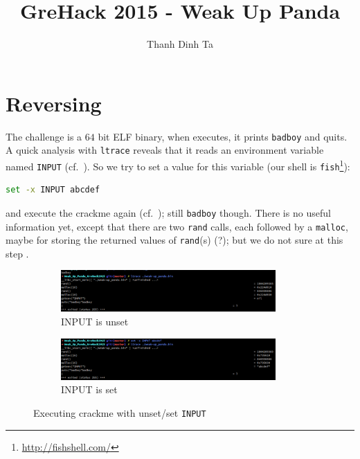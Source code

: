 \documentclass{easychair}
\begin{document}
\title{GreHack 2015 - Weak Up Panda}

\author{Thanh Dinh Ta}


\clearpage
\maketitle

\section{Reversing}
The challenge is a $64$ bit ELF binary, when executes, it prints \texttt{badboy} and quits. A quick analysis with \texttt{ltrace} reveals that it reads an environment variable named \texttt{INPUT} (cf.~). So we try to set a value for this variable (our shell is \texttt{fish}\footnote{\url{http://fishshell.com/}}):
\begin{lstlisting}[frame=lines, caption={Setting \texttt{INPUT}}, captionpos=b, boxpos=b, language=bash, label=lst:keygen]
set -x INPUT abcdef
\end{lstlisting}
and execute the crackme again (cf.~); still \texttt{badboy} though. There is no useful information yet, except that there are two \texttt{rand} calls, each followed by a \texttt{malloc}, maybe for storing the returned values of \texttt{rand}(s) (?); but we do not sure at this step \blacksmiley{}.

\begin{figure}[ht]
  \centering
  \begin{subfigure}[b]{0.5\textwidth}
    \centering
    \includegraphics[width=0.9\textwidth,keepaspectratio]{ltrace_check.png}
    \caption{INPUT is unset}
    \label{fig:unset_input}
  \end{subfigure}%
  \begin{subfigure}[b]{0.5\textwidth}
    \centering
    \includegraphics[width=0.9\textwidth,keepaspectratio]{ltrace_check_with_input.png}
    \caption{INPUT is set}
    \label{fig:set_input}
  \end{subfigure}
  \caption{Executing crackme with unset/set \texttt{INPUT}}
\end{figure}
\end{document}
